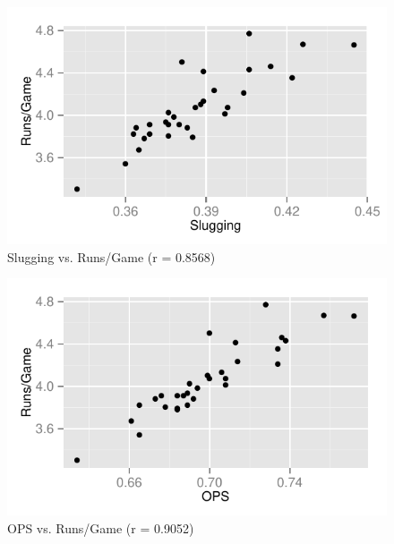 \documentclass[landscape]{article}
\begin{document}
  \begin{figure}[H]
    \centering
    \includegraphics[scale = 0.9]{figures/mlb/slg_vs_rg.pdf}
    \caption{Slugging vs. Runs/Game (r = 0.8568)}
  \end{figure}

  \begin{figure}[H]
    \centering
    \includegraphics[scale = 0.9]{figures/mlb/ops_vs_rg.pdf}
    \caption{OPS vs. Runs/Game (r = 0.9052)}
  \end{figure}
\end{document}
